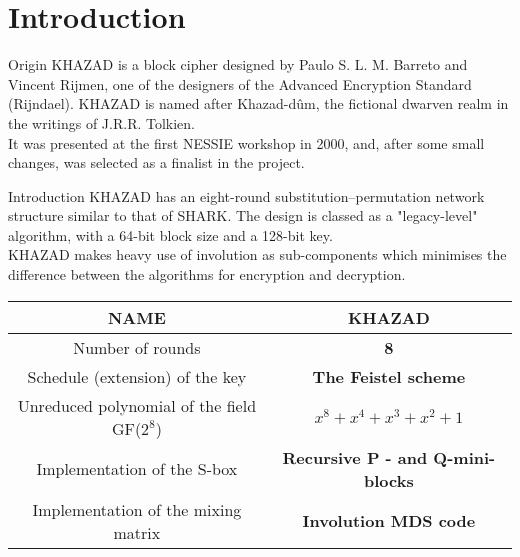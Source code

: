 \section{Introduction}

\begin{frame}{Origin}
    KHAZAD is a block cipher designed by Paulo S. L. M. Barreto and Vincent Rijmen, one of the designers of the Advanced Encryption Standard (Rijndael). KHAZAD is named after Khazad-dûm, the fictional dwarven realm in the writings of J.R.R. Tolkien. \\
    \medskip
    It was presented at the first NESSIE workshop in 2000, and, after some small changes, was selected as a finalist in the project.
\end{frame}
    
\begin{frame}{Introduction}
    KHAZAD has an eight-round substitution–permutation network structure similar to that of SHARK. The design is classed as a "legacy-level" algorithm, with a 64-bit block size and a 128-bit key. \\
    \medskip
    KHAZAD makes heavy use of involution as sub-components which minimises the difference between the algorithms for encryption and decryption.
    \begin{table}[h]
    \footnotesize
    \centering
    \begin{tabular}{|c|c|}
    \hline
    NAME                                     & \textbf{KHAZAD}                         \\ \hline
    Number of rounds                         & \textbf{8}                              \\ \hline
    Schedule (extension) of the key          & \textbf{The Feistel scheme}             \\ \hline
    Unreduced polynomial of the field GF($2^8$) & \textbf{$x^8 + x^4 + x^3 + x^2 + 1$} \\ \hline
    Implementation of the S-box              & \textbf{Recursive P - and Q-mini-blocks} \\ \hline
    Implementation of the mixing matrix      & \textbf{Involution MDS code}          \\ \hline
    \end{tabular}
    \end{table}
\end{frame}